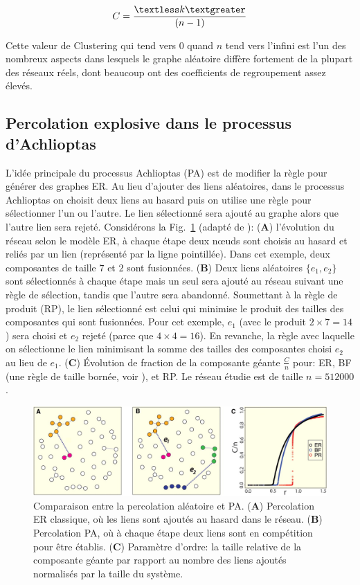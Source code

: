  \begin{equation}
 C=\dfrac{\textless k\textgreater}{(n - 1)}
 \end{equation}
 
 Cette valeur de Clustering qui tend vers $0$ quand $n$ tend vers l'infini est l'un des nombreux aspects dans lesquels le graphe aléatoire diffère fortement de la plupart des réseaux réels, dont beaucoup ont des coefficients de regroupement assez élevés.

\subsection{Percolation explosive dans le processus d'Achlioptas}

L'idée principale du processus Achlioptas (PA) \cite{Achlioptas-al2009} est de modifier la règle pour générer des graphes ER. Au lieu d'ajouter des liens aléatoires, dans le processus Achlioptas on choisit deux liens au hasard puis on utilise une règle pour sélectionner l'un ou l'autre. Le lien sélectionné sera ajouté au graphe alors que l'autre lien sera rejeté. Considérons la Fig.~\ref{achlioptas} (adapté de \cite{Achlioptas-al2009}): (\textbf{A}) l'évolution du réseau  selon le modèle ER, à chaque étape deux nœuds sont choisis au hasard et reliés par un lien (représenté par la ligne pointillée). Dans cet exemple, deux composantes de taille $7$ et $2$ sont fusionnées. (\textbf{B}) Deux liens aléatoires $\{e_1,e_2\}$ sont sélectionnés à chaque étape mais un seul sera ajouté au réseau suivant une règle de sélection, tandis que l'autre sera abandonné.
Soumettant à la règle de produit (RP), le lien sélectionné est celui qui minimise le produit des tailles des composantes qui sont fusionnées. Pour cet exemple, $e_1$ (avec le produit $2\times7=14$) sera choisi et $e_2$ rejeté (parce que $4\times4=16$). En revanche, la règle avec laquelle on sélectionne le lien minimisant la somme des tailles des composantes choisi $e_2$ au lieu de $e_1$. (\textbf{C}) Évolution de fraction de la composante géante  $\frac{C}{n}$ pour: ER, BF (une règle de taille bornée, voir \cite{Bohman-Frieze2001}), et RP. Le réseau étudie est de taille $n=512000$.
\begin{figure}[h!]
	\centering
	\includegraphics[scale=0.35]{./figures/achlioptas3}
	\caption{Comparaison entre la percolation aléatoire et PA. (\textbf{A}) Percolation ER classique, où les liens sont ajoutés au hasard dans le réseau. (\textbf{B}) Percolation PA, où à chaque étape deux liens sont en compétition pour être établis. (\textbf{C}) Paramètre d'ordre: la taille relative de la composante géante par rapport au nombre des liens ajoutés normalisés par la taille du système.}
	\label{achlioptas}
\end{figure}

